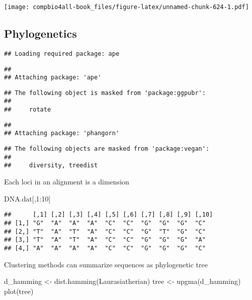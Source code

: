 \documentclass[
]{book}
\newenvironment{Shaded}{\begin{snugshade}}{\end{snugshade}}
\newcommand{\DecValTok}[1]{\textcolor[rgb]{0.00,0.00,0.81}{#1}}
\newcommand{\FunctionTok}[1]{\textcolor[rgb]{0.00,0.00,0.00}{#1}}
\newcommand{\NormalTok}[1]{#1}
\newcommand{\OtherTok}[1]{\textcolor[rgb]{0.56,0.35,0.01}{#1}}
\newcommand{\SpecialCharTok}[1]{\textcolor[rgb]{0.00,0.00,0.00}{#1}}
\begin{document}
\texttt{[image: compbio4all-book\_files/figure-latex/unnamed-chunk-624-1.pdf]}

\hypertarget{phylogenetics}{%
\subsection{Phylogenetics}\label{phylogenetics}}

\begin{verbatim}
## Loading required package: ape
\end{verbatim}

\begin{verbatim}
## 
## Attaching package: 'ape'
\end{verbatim}

\begin{verbatim}
## The following object is masked from 'package:ggpubr':
## 
##     rotate
\end{verbatim}

\begin{verbatim}
## 
## Attaching package: 'phangorn'
\end{verbatim}

\begin{verbatim}
## The following objects are masked from 'package:vegan':
## 
##     diversity, treedist
\end{verbatim}

Each loci in an alignment is a dimension

\begin{Shaded}
\begin{Highlighting}[]
\NormalTok{DNA.dat[,}\DecValTok{1}\SpecialCharTok{:}\DecValTok{10}\NormalTok{]}
\end{Highlighting}
\end{Shaded}

\begin{verbatim}
##      [,1] [,2] [,3] [,4] [,5] [,6] [,7] [,8] [,9] [,10]
## [1,] "G"  "A"  "A"  "A"  "C"  "C"  "G"  "G"  "G"  "C"  
## [2,] "T"  "A"  "T"  "A"  "C"  "C"  "G"  "T"  "G"  "C"  
## [3,] "T"  "A"  "T"  "A"  "C"  "C"  "G"  "G"  "G"  "A"  
## [4,] "A"  "A"  "A"  "A"  "C"  "C"  "G"  "G"  "G"  "C"
\end{verbatim}

Clustering methods can summarize sequences as phylogenetic tree

\begin{Shaded}
\begin{Highlighting}[]
\NormalTok{d\_hamming }\OtherTok{\textless{}{-}} \FunctionTok{dist.hamming}\NormalTok{(Laurasiatherian)}
\NormalTok{tree }\OtherTok{\textless{}{-}} \FunctionTok{upgma}\NormalTok{(d\_hamming)}
\FunctionTok{plot}\NormalTok{(tree)}
\end{Highlighting}
\end{Shaded}
\end{document}
